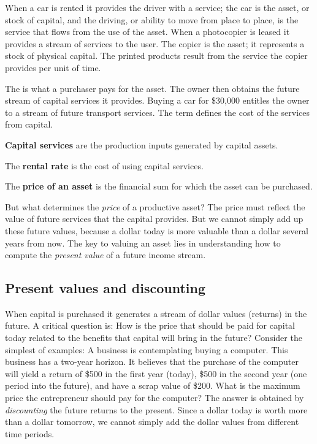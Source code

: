 When a car is rented it provides the driver with a service; the car is the
asset, or stock of capital, and the driving, or ability to move from place
to place, is the service that flows from the use of the asset. When a
photocopier is leased it provides a stream of services to the user. The
copier is the asset; it represents a stock of physical capital. The printed
products result from the service the copier provides per unit of time.

The  is what a purchaser pays for the asset.
The owner then obtains the future stream of capital services it provides.
Buying a car for \$30,000 entitles the owner to a stream of future transport
services. The term  defines the cost of
the services from capital.

\begin{DefBox}
\textbf{Capital services} are the production inputs generated by capital assets.

The \textbf{rental rate} is the cost of using capital services.

The \textbf{price of an asset} is the financial sum for which the asset can be purchased.
\end{DefBox}

But what determines the \textit{price} of a productive asset? The price must
reflect the value of future services that the capital provides. But we
cannot simply add up these future values, because a dollar today is more
valuable than a dollar several years from now. The key to valuing an asset
lies in understanding how to compute the \textit{present value} of a future
income stream.

\newhtmlpage

\subsection*{Present values and discounting}

When capital is purchased it generates a stream of dollar values (returns)
in the future. A critical question is: How is the price that should be paid
for capital today related to the benefits that capital will bring in the
future? Consider the simplest of examples: A business is contemplating
buying a computer. This business has a two-year horizon. It believes that
the purchase of the computer will yield a return of \$500 in the first year
(today), \$500 in the second year (one period into the future), and have a
scrap value of \$200. What is the maximum price the entrepreneur should pay
for the computer? The answer is obtained by \textit{discounting} the future
returns to the present. Since a dollar today is worth more than a dollar
tomorrow, we cannot simply add the dollar values from different time periods.

